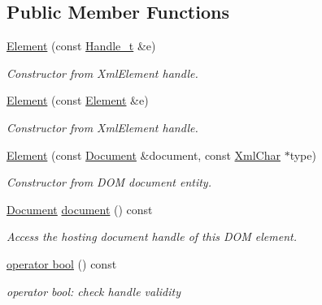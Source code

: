 \subsection*{Public Member Functions}
\begin{DoxyCompactItemize}
\item 
\hyperlink{class_d_d4hep_1_1_x_m_l_1_1_element_aa30c6619a40cf7e61e6e07d2f21277e5}{Element} (const \hyperlink{class_d_d4hep_1_1_x_m_l_1_1_handle__t}{Handle\_\-t} \&e)
\begin{DoxyCompactList}\small\item\em Constructor from XmlElement handle. \item\end{DoxyCompactList}\item 
\hyperlink{class_d_d4hep_1_1_x_m_l_1_1_element_abc4154273029baf538d1f9b68e6196a6}{Element} (const \hyperlink{class_d_d4hep_1_1_x_m_l_1_1_element}{Element} \&e)
\begin{DoxyCompactList}\small\item\em Constructor from XmlElement handle. \item\end{DoxyCompactList}\item 
\hyperlink{class_d_d4hep_1_1_x_m_l_1_1_element_a9f3edfe23e1514d285b10a20932875e7}{Element} (const \hyperlink{class_d_d4hep_1_1_x_m_l_1_1_document}{Document} \&document, const \hyperlink{namespace_d_d4hep_1_1_x_m_l_a09e5d9cc86ed782f6826dfe0778c1815}{XmlChar} $\ast$type)
\begin{DoxyCompactList}\small\item\em Constructor from DOM document entity. \item\end{DoxyCompactList}\item 
\hyperlink{class_d_d4hep_1_1_x_m_l_1_1_document}{Document} \hyperlink{class_d_d4hep_1_1_x_m_l_1_1_element_a6bbad32abb6077fe0cc8fff54eb5cbaa}{document} () const 
\begin{DoxyCompactList}\small\item\em Access the hosting document handle of this DOM element. \item\end{DoxyCompactList}\item 
\hyperlink{class_d_d4hep_1_1_x_m_l_1_1_element_aae23b243716ff238b24882fb15cdeb70}{operator bool} () const 
\begin{DoxyCompactList}\small\item\em operator bool: check handle validity \item\end{DoxyCompactList}\item 

\end{DoxyCompactItemize}
